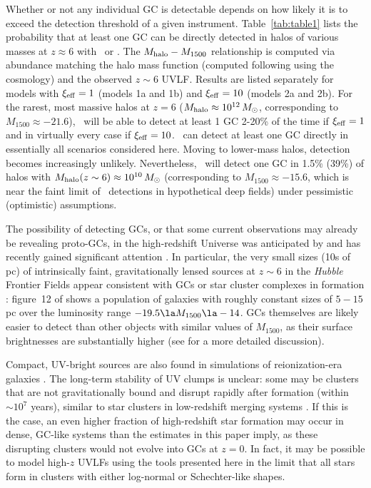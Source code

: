 \documentclass[fleqn,usenatbib]{mnras}
\newcommand{\xieff}{\xi_{\rm eff}}
\begin{document}
{Whether or not any individual GC is detectable depends on how likely it is to
exceed the detection threshold of a given instrument. Table~\ref{tab:table1}
lists the probability that at least one GC can be directly detected in halos of
various masses at $z \approx 6$ with \hst\ or \jwst. The $M_{\rm halo}-M_{1500}$
relationship is computed via abundance matching the halo mass function (computed
following \citealt{sheth2001} using the \citealt{planck2015} cosmology) and the
observed $z\sim 6$ UVLF. Results are listed separately for models with
$\xieff=1$ (models 1a and 1b) and $\xieff=10$ (models 2a and 2b). For the
rarest, most massive halos at $z=6$ ($M_{\rm halo} \approx 10^{12}\,M_{\odot}$,
corresponding to $M_{1500} \approx -21.6$), \hst\ will be able to detect at
least 1 GC 2-20\% of the time if $\xieff=1$ and in virtually every case if
$\xieff=10$. \jwst\ can detect at least one GC directly in essentially all
scenarios considered here. Moving to lower-mass halos, detection becomes
increasingly unlikely. Nevertheless, \jwst\ will detect one GC in 1.5\% (39\%)
of halos with $M_{\rm halo}(z\sim 6) \approx 10^{10}\,M_{\odot}$ (corresponding to
$M_{1500} \approx -15.6$, which is near the faint limit of \jwst\ detections in
hypothetical deep fields) under pessimistic (optimistic) assumptions.

The possibility of detecting GCs, or that some current observations may already
be revealing proto-GCs, in the high-redshift Universe was anticipated by
\citet{carlberg2002} and has recently gained significant attention
\citep{schaerer2011, katz2013, bouwens2017, boylan-kolchin2017, renzini2017,
  vanzella2017}. In particular, the very small sizes (10s of pc) of
intrinsically faint, gravitationally lensed sources at $z\sim 6$ in the
\textit{Hubble} Frontier Fields appear consistent with GCs or star cluster
complexes in formation \citep{kawamata2015, vanzella2017, bouwens2017,
  kawamata2018}: figure~12 of \citet{bouwens2017} shows a population of galaxies
with roughly constant sizes of $5-15$ pc over the luminosity range
$-19.5 \la M_{1500} \la -14$. GCs themselves are likely easier to detect than
other objects with similar values of $M_{1500}$, as their surface brightnesses
are substantially higher (see \citealt{zick2018} for a more detailed
discussion).

Compact, UV-bright sources are also found in simulations of reionization-era
galaxies \citep{kimm2016, ma2017a, kim2018}. The long-term stability of UV
clumps is unclear: some may be clusters that are not gravitationally bound and
disrupt rapidly after formation (within $\sim 10^7$ years), similar to star
clusters in low-redshift merging systems \citep{bastian2005,fall2005}. If this
is the case, an even higher fraction of high-redshift star formation may occur
in dense, GC-like systems than the estimates in this paper imply, as these
disrupting clusters would not evolve into GCs at $z=0$. In fact, it may be
possible to model high-$z$ UVLFs using the tools presented here in the limit
that all stars form in clusters with either log-normal or Schechter-like shapes.
 

}
\end{document}

